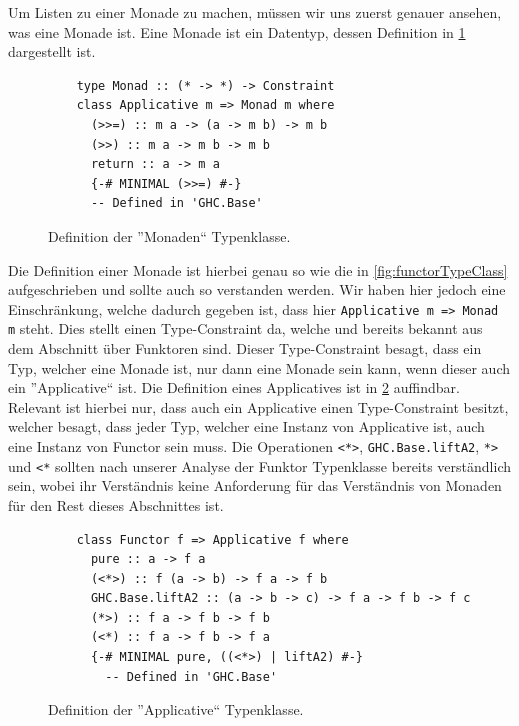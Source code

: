 \documentclass{hhuarticle}
\theoremstyle{definition}
\theoremstyle{theorem}
\begin{document}
  Um Listen zu einer Monade zu machen, müssen wir uns zuerst genauer ansehen,
  was eine Monade ist. Eine Monade ist ein Datentyp, dessen Definition
  in \cref{fig:MonadeDef} dargestellt ist.

  \begin{figure}[h]
    \begin{lstlisting}
    type Monad :: (* -> *) -> Constraint
    class Applicative m => Monad m where
      (>>=) :: m a -> (a -> m b) -> m b
      (>>) :: m a -> m b -> m b
      return :: a -> m a
      {-# MINIMAL (>>=) #-}
      -- Defined in 'GHC.Base'
    \end{lstlisting}
    \caption{Definition der ''Monaden`` Typenklasse.}%
    \label{fig:MonadeDef}
  \end{figure}

  Die Definition einer Monade ist hierbei genau so wie die in
  \cref{fig:functorTypeClass} aufgeschrieben und sollte auch so
  verstanden werden. Wir haben hier jedoch eine Einschränkung,
  welche dadurch gegeben ist, dass hier \verb|Applicative m => Monad m|
  steht. Dies stellt einen Type-Constraint da, welche
  und bereits bekannt aus dem Abschnitt über Funktoren sind.
  Dieser Type-Constraint besagt, dass ein Typ, welcher eine Monade
  ist, nur dann eine Monade sein kann, wenn dieser auch ein ''Applicative`` ist.
  Die Definition eines Applicatives ist in \cref{fig:ApplicativeDef}
  auffindbar. Relevant ist hierbei nur, dass auch ein Applicative einen
  Type-Constraint besitzt, welcher besagt, dass jeder Typ, welcher
  eine Instanz von Applicative ist, auch eine Instanz von Functor
  sein muss. Die Operationen \verb|<*>|, \verb|GHC.Base.liftA2|,  \verb|*>| 
  und \verb|<*| sollten nach unserer Analyse der Funktor Typenklasse bereits
  verständlich sein, wobei ihr Verständnis keine Anforderung
  für das Verständnis von Monaden für den Rest dieses Abschnittes ist.

  \begin{figure}[h]
    \begin{lstlisting}
    class Functor f => Applicative f where
      pure :: a -> f a
      (<*>) :: f (a -> b) -> f a -> f b
      GHC.Base.liftA2 :: (a -> b -> c) -> f a -> f b -> f c
      (*>) :: f a -> f b -> f b
      (<*) :: f a -> f b -> f a
      {-# MINIMAL pure, ((<*>) | liftA2) #-}
        -- Defined in 'GHC.Base'
    \end{lstlisting}
    \caption{Definition der ''Applicative`` Typenklasse.}%
    \label{fig:ApplicativeDef}
  \end{figure}
\end{document}
